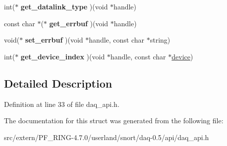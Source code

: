 \begin{DoxyCompactItemize}
\item 
\hypertarget{struct__daq__module_abfe4c34342d3fe3a700e6e32c145b90c}{
int($\ast$ {\bfseries get\_\-datalink\_\-type} )(void $\ast$handle)}
\label{struct__daq__module_abfe4c34342d3fe3a700e6e32c145b90c}

\item 
\hypertarget{struct__daq__module_a046dd101206bfa69393885375680fc07}{
const char $\ast$($\ast$ {\bfseries get\_\-errbuf} )(void $\ast$handle)}
\label{struct__daq__module_a046dd101206bfa69393885375680fc07}

\item 
\hypertarget{struct__daq__module_a2bc4c08bf2d138b64bcbbc350fb7ba6b}{
void($\ast$ {\bfseries set\_\-errbuf} )(void $\ast$handle, const char $\ast$string)}
\label{struct__daq__module_a2bc4c08bf2d138b64bcbbc350fb7ba6b}

\item 
\hypertarget{struct__daq__module_adc8a8f0ecf1c07de2885cca21834b092}{
int($\ast$ {\bfseries get\_\-device\_\-index} )(void $\ast$handle, const char $\ast$\hyperlink{structdevice}{device})}
\label{struct__daq__module_adc8a8f0ecf1c07de2885cca21834b092}

\end{DoxyCompactItemize}


\subsection{Detailed Description}


Definition at line 33 of file daq\_\-api.h.



The documentation for this struct was generated from the following file:\begin{DoxyCompactItemize}
\item 
src/extern/PF\_\-RING-\/4.7.0/userland/snort/daq-\/0.5/api/daq\_\-api.h\end{DoxyCompactItemize}
